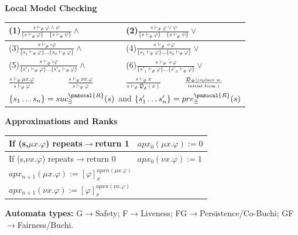 \documentclass{article}
\newcommand{\Rb}{\pazocal{R}}
\newcommand{\Db}{\mathfrak{D}}
\begin{document}
\begin{multicols}{4}
\textbf{Local Model Checking}
\begin{tabular}{|l|l|l|l|}
\hline
\multicolumn{2}{|l|}{\tiny(1)\small$\frac{s \vdash_{\Phi} \varphi \wedge \psi}{\{s \vdash_{\Phi} \varphi \} \quad \{s \vdash_{\Phi} \psi\}} \wedge$} & \multicolumn{2}{|l|}{\tiny(2)\small$\frac{s \vdash_{\Phi} \varphi \vee \psi}{\{s \vdash_{\Phi} \varphi \} \quad \{s \vdash_{\Phi} \psi\}} \vee $}\\ \hline
\multicolumn{2}{|l|}{\tiny(3)\small$\frac{s \vdash_{\Phi} \square \varphi}{\{s_1 \vdash_{\Phi} \varphi\} \dots \{s_n \vdash_{\Phi} \varphi\}} \wedge$}&\multicolumn{2}{|l|}{\tiny(4)\small$\frac{s \vdash_{\Phi} \diamond \varphi}{\{s_1 \vdash_{\Phi} \varphi\} \dots \{s_n \vdash_{\Phi} \varphi\}} \vee$} \\
 \hline
\multicolumn{2}{|l|}{\tiny(5)\small$\frac{s \vdash_{\Phi} \overleftarrow{\square} \varphi}{\{s'_1 \vdash_{\Phi} \varphi \}\dots \{ s'_n \vdash_{\Phi} \varphi\}} \wedge$} &\multicolumn{2}{|l|}{\tiny(6)\small$\frac{s \vdash_{\Phi} \overleftarrow{\diamond} \varphi}{\{s'_1 \vdash_{\Phi} \varphi \}\dots \{ s'_n \vdash_{\Phi} \varphi\}} \vee$} \\
 \hline
$\frac{s \vdash_{\Phi} \mu x.\varphi}{s \vdash_{\Phi} \varphi}$ &$\frac{s \vdash_{\Phi} \nu x.\varphi}{s \vdash_{\Phi} \varphi}$&$\frac{s \vdash_{\Phi} x}{s \vdash_{\Phi} \Db_{\Phi}(x)}$&$\frac{\Db_{\Phi}\text{\tiny (replace w.}}{\text{\tiny initial form.)}}$\\
 \hline
\multicolumn{4}{|l|}{$\{s_1 \dots s_n \}=suc^{\Rb}_{\exists}({s})$ and $\{s'_1 \dots s'_n \}=pre^{\Rb}_{\exists}({s})$}\\ \hline 
\end{tabular}
\textbf{Approximations and Ranks}
\begin{tabular}{|l|l|}
\hline
If (s,$\mu x.\varphi$) repeats$\rightarrow$return 1&$apx_0(\mu x.\varphi):=0$\\ \hline
If (s,$\nu x.\varphi$) repeats$\rightarrow$return 0& $apx_0(\nu x.\varphi):=1$\\ \hline
\multicolumn{2}{|l|}{$apx_{n+1}(\mu x.\varphi):=[\varphi]_{x}^{apx{n}(\mu x.\varphi)}$}\\ \hline
\multicolumn{2}{|l|}{$apx_{n+1}(\nu x.\varphi):=[\varphi]_{x}^{apx{n}(\nu x.\varphi)}$}\\ \hline
\end{tabular}
\textbf{Automata types:} G$\rightarrow$Safety; F$\rightarrow$Liveness; FG$\rightarrow$Persistence/Co-Buchi; GF$\rightarrow$Fairness/Buchi.


\end{multicols}
\end{document}
